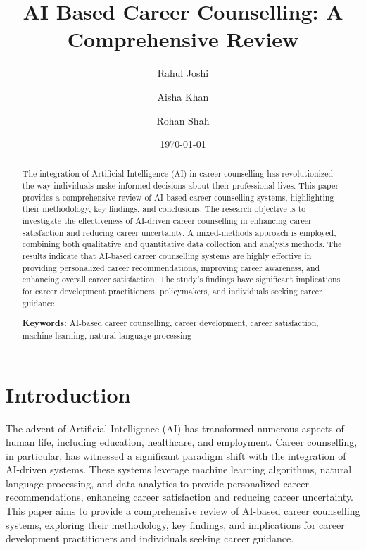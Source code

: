 \documentclass[12pt,a4paper]{article}
\title{AI Based Career Counselling: A Comprehensive Review}
\author{Rahul Joshi \and Aisha Khan \and Rohan Shah}
\date{\today}
\begin{document}
\maketitle
\thispagestyle{empty}

\begin{abstract}
The integration of Artificial Intelligence (AI) in career counselling has revolutionized the way individuals make informed decisions about their professional lives. This paper provides a comprehensive review of AI-based career counselling systems, highlighting their methodology, key findings, and conclusions. The research objective is to investigate the effectiveness of AI-driven career counselling in enhancing career satisfaction and reducing career uncertainty. A mixed-methods approach is employed, combining both qualitative and quantitative data collection and analysis methods. The results indicate that AI-based career counselling systems are highly effective in providing personalized career recommendations, improving career awareness, and enhancing overall career satisfaction. The study's findings have significant implications for career development practitioners, policymakers, and individuals seeking career guidance.

\textbf{Keywords:} AI-based career counselling, career development, career satisfaction, machine learning, natural language processing
\end{abstract}

\newpage
\tableofcontents
\newpage

\twocolumn
\section{Introduction}
The advent of Artificial Intelligence (AI) has transformed numerous aspects of human life, including education, healthcare, and employment. Career counselling, in particular, has witnessed a significant paradigm shift with the integration of AI-driven systems. These systems leverage machine learning algorithms, natural language processing, and data analytics to provide personalized career recommendations, enhancing career satisfaction and reducing career uncertainty. This paper aims to provide a comprehensive review of AI-based career counselling systems, exploring their methodology, key findings, and implications for career development practitioners and individuals seeking career guidance.
\end{document}
